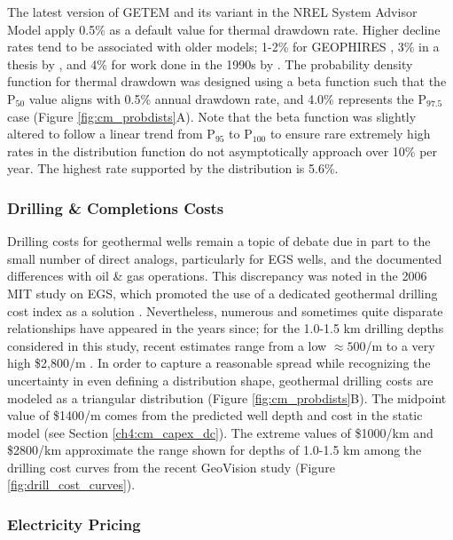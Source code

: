 The latest version of GETEM \citep{mines_getem_2016} and its variant in the NREL System Advisor Model \citep{freeman_system_2018} apply 0.5\% as a default value for thermal drawdown rate. Higher decline rates tend to be associated with older models; 1-2\% for GEOPHIRES \citep{beckers_low-temperature_2016}, 3\% in a thesis by \citet{augustine_hydrothermal_2009}, and 4\% for work done in the 1990s by \citet{tester_economic_1990}. The probability density function for thermal drawdown was designed using a beta function such that the P$_{50}$ value aligns with 0.5\% annual drawdown rate, and 4.0\% represents the P$_{97.5}$ case (Figure \ref{fig:cm_probdists}A). Note that the beta function was slightly altered to follow a linear trend from P$_{95}$ to P$_{100}$ to ensure rare extremely high rates in the distribution function do not asymptotically approach over 10\% per year. The highest rate supported by the distribution is 5.6\%.

\subsubsection{Drilling \& Completions Costs}
\label{cm4:prob_dc}

Drilling costs for geothermal wells remain a topic of debate due in part to the small number of direct analogs, particularly for EGS wells, and the documented differences with oil \& gas operations. This discrepancy was noted in the 2006 MIT study on EGS, which promoted the use of a dedicated geothermal drilling cost index as a solution \citep{tester_future_2006}. Nevertheless, numerous and sometimes quite disparate relationships have appeared in the years since; for the 1.0-1.5 km drilling depths considered in this study, recent estimates range from a low $\approx500$/m \citep{lukawski_uncertainty_2016} to a very high \$2,800/m \citep{lowry_implications_2017}. In order to capture a reasonable spread while recognizing the uncertainty in even defining a distribution shape, geothermal drilling costs are modeled as a triangular distribution (Figure \ref{fig:cm_probdists}B). The midpoint value of \$1400/m comes from the predicted well depth and cost in the static model (see Section \ref{ch4:cm_capex_dc}). The extreme values of \$1000/km and \$2800/km approximate the range shown for depths of 1.0-1.5 km among the drilling cost curves from the recent GeoVision study (Figure \ref{fig:drill_cost_curves}).

\subsubsection{Electricity Pricing}
\label{cm4:prob_price}

